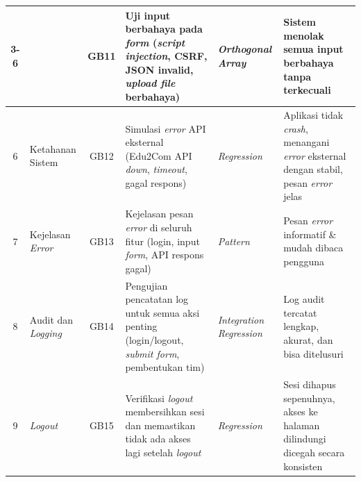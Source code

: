 {\begin{longtable}{|c|p{1.4cm}|c|p{2.4cm}|p{1.3cm}|p{1.9cm}|}
			\cline{3-6}
			            &                            & GB11          & Uji input berbahaya pada \textit{form} (\textit{script injection}, CSRF, JSON invalid, \textit{upload file} berbahaya)                & \textit{Orthogonal Array}                      & Sistem menolak semua input berbahaya tanpa terkecuali                                                       \\
			\hline
			6           & Ketahanan Sistem           & GB12          & Simulasi \textit{error} API eksternal (Edu2Com API \textit{down}, \textit{timeout}, gagal respons)                                    & \textit{Regression}                            & Aplikasi tidak \textit{crash}, menangani \textit{error} eksternal dengan stabil, pesan \textit{error} jelas \\
			\hline
			7           & Kejelasan \textit{Error}   & GB13          & Kejelasan pesan \textit{error} di seluruh fitur (login, input \textit{form}, API respons gagal)                                       & \textit{Pattern}                               & Pesan \textit{error} informatif \& mudah dibaca pengguna                                                    \\
			\hline
			8           & Audit dan \textit{Logging} & GB14          & Pengujian pencatatan log untuk semua aksi penting (login/logout, \textit{submit form}, pembentukan tim)                               & \textit{Integration Regression}                & Log audit tercatat lengkap, akurat, dan bisa ditelusuri                                                     \\
			\hline
			9           & \textit{Logout}            & GB15          & Verifikasi \textit{logout} membersihkan sesi dan memastikan tidak ada akses lagi setelah \textit{logout}                              & \textit{Regression}                            & Sesi dihapus sepenuhnya, akses ke halaman dilindungi dicegah secara konsisten                               \\
		\end{longtable}
	}
